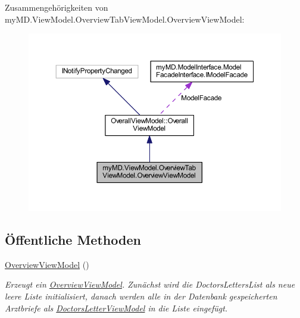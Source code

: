 Zusammengehörigkeiten von my\+M\+D.\+View\+Model.\+Overview\+Tab\+View\+Model.\+Overview\+View\+Model\+:
\nopagebreak
\begin{figure}[H]
\begin{center}
\leavevmode
\includegraphics[width=350pt]{classmy_m_d_1_1_view_model_1_1_overview_tab_view_model_1_1_overview_view_model__coll__graph}
\end{center}
\end{figure}
\subsection*{Öffentliche Methoden}
\begin{DoxyCompactItemize}
\item 
\mbox{\hyperlink{classmy_m_d_1_1_view_model_1_1_overview_tab_view_model_1_1_overview_view_model_a8099d87e6d22edcd5119a845cd16d96b}{Overview\+View\+Model}} ()
\begin{DoxyCompactList}\small\item\em Erzeugt ein \mbox{\hyperlink{classmy_m_d_1_1_view_model_1_1_overview_tab_view_model_1_1_overview_view_model}{Overview\+View\+Model}}. Zunächst wird die Doctors\+Letters\+List als neue leere Liste initialisiert, danach werden alle in der Datenbank gespeicherten Arztbriefe als \mbox{\hyperlink{classmy_m_d_1_1_view_model_1_1_overview_tab_view_model_1_1_doctors_letter_view_model}{Doctors\+Letter\+View\+Model}} in die Liste eingefügt. \end{DoxyCompactList}\end{DoxyCompactItemize}
